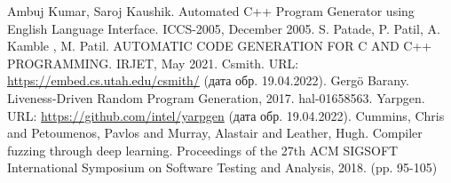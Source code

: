 \documentclass[a4paper,article,14pt]{extarticle}
\begin{document}


\tableofcontents
\pagebreak

















\begin{thebibliography}{1}
     Ambuj Kumar, Saroj Kaushik. Automated C++ Program Generator using English Language Interface. ICCS-2005, December 2005.
     S. Patade, P. Patil, A. Kamble , M. Patil. AUTOMATIC CODE GENERATION FOR C AND C++ PROGRAMMING. IRJET, May 2021.
     Csmith. URL: \url{https://embed.cs.utah.edu/csmith/} (дата обр. 19.04.2022).
     Gergö Barany. Liveness-Driven Random Program Generation, 2017. hal-01658563.
     Yarpgen. URL: \url{https://github.com/intel/yarpgen} (дата обр. 19.04.2022).
     Cummins, Chris and Petoumenos, Pavlos and Murray, Alastair and Leather, Hugh.
    Compiler fuzzing through deep learning.
    Proceedings of the 27th ACM SIGSOFT International Symposium on Software Testing and Analysis, 2018. (pp. 95-105)
\end{thebibliography}
\end{document}
